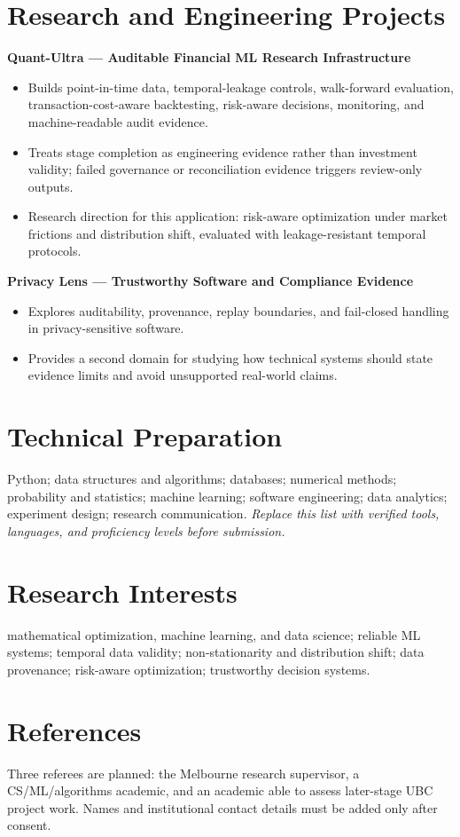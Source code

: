 \documentclass[11pt]{article}
\begin{document}
\section*{Research and Engineering Projects}
\textbf{Quant-Ultra --- Auditable Financial ML Research Infrastructure}
\begin{itemize}
\item Builds point-in-time data, temporal-leakage controls, walk-forward evaluation, transaction-cost-aware backtesting, risk-aware decisions, monitoring, and machine-readable audit evidence.
\item Treats stage completion as engineering evidence rather than investment validity; failed governance or reconciliation evidence triggers review-only outputs.
\item Research direction for this application: risk-aware optimization under market frictions and distribution shift, evaluated with leakage-resistant temporal protocols.
\end{itemize}

\begin{samepage}
\textbf{Privacy Lens --- Trustworthy Software and Compliance Evidence}
\begin{itemize}
\item Explores auditability, provenance, replay boundaries, and fail-closed handling in privacy-sensitive software.
\item Provides a second domain for studying how technical systems should state evidence limits and avoid unsupported real-world claims.
\end{itemize}
\end{samepage}

\section*{Technical Preparation}
Python; data structures and algorithms; databases; numerical methods; probability and statistics; machine learning; software engineering; data analytics; experiment design; research communication. \textit{Replace this list with verified tools, languages, and proficiency levels before submission.}

\section*{Research Interests}
mathematical optimization, machine learning, and data science; reliable ML systems; temporal data validity; non-stationarity and distribution shift; data provenance; risk-aware optimization; trustworthy decision systems.

\section*{References}
Three referees are planned: the Melbourne research supervisor, a CS/ML/algorithms academic, and an academic able to assess later-stage UBC project work. Names and institutional contact details must be added only after consent.
\end{document}
